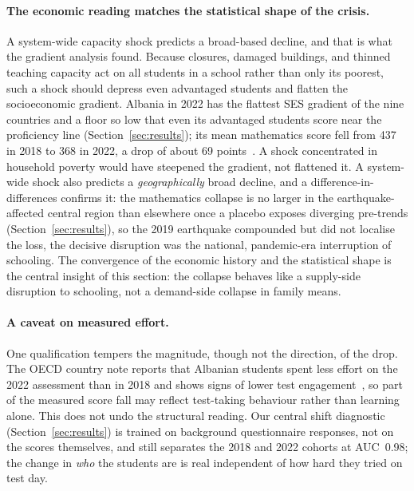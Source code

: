 \paragraph{The economic reading matches the statistical shape of the crisis.}
A system-wide capacity shock predicts a broad-based decline, and that is what the
gradient analysis found. Because closures, damaged buildings, and thinned teaching
capacity act on all students in a school rather than only its poorest, such a shock
should depress even advantaged students and flatten the socioeconomic gradient. Albania
in 2022 has the flattest SES gradient of the nine countries and a floor so low that
even its advantaged students score near the proficiency line
(Section~\ref{sec:results}); its mean mathematics score fell from 437 in 2018 to 368 in
2022, a drop of about 69 points~\citep{oecd_albania_note2023}. A shock concentrated in
household poverty would have steepened the gradient, not flattened it. A system-wide
shock also predicts a \emph{geographically} broad decline, and a difference-in-differences
confirms it: the mathematics collapse is no larger in the earthquake-affected central
region than elsewhere once a placebo exposes diverging pre-trends
(Section~\ref{sec:results}), so the 2019 earthquake compounded but did not localise the
loss, the decisive disruption was the national, pandemic-era interruption of schooling.
The convergence of the economic history and the statistical shape is the central insight
of this section: the collapse behaves like a supply-side disruption to schooling, not a
demand-side collapse in family means.

\paragraph{A caveat on measured effort.}
One qualification tempers the magnitude, though not the direction, of the drop. The OECD
country note reports that Albanian students spent less effort on the 2022 assessment
than in 2018 and shows signs of lower test engagement~\citep{oecd_albania_note2023}, so
part of the measured score fall may reflect test-taking behaviour rather than learning
alone. This does not undo the structural reading. Our central shift diagnostic
(Section~\ref{sec:results}) is trained on background questionnaire responses, not on the
scores themselves, and still separates the 2018 and 2022 cohorts at AUC~0.98; the change
in \emph{who} the students are is real independent of how hard they tried on test day.

